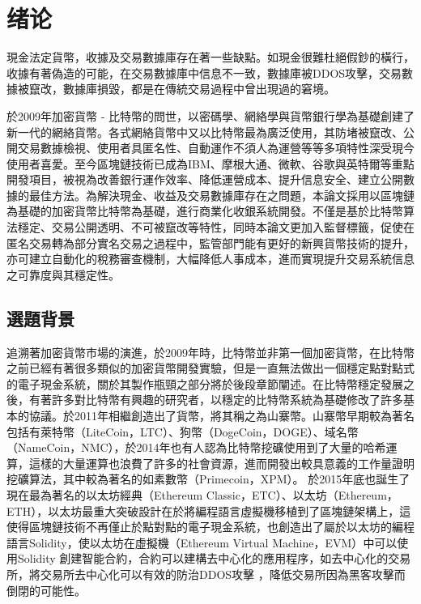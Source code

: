 
\chapter{绪论}

	現金法定貨幣，收據及交易數據庫存在著一些缺點。如現金很難杜絕假鈔的橫行，收據有著偽造的可能，在交易數據庫中信息不一致，數據庫被DDOS攻擊，交易數據被竄改，數據庫損毀，都是在傳統交易過程中曾出現過的窘境。

	於2009年加密貨幣 - 比特幣的問世，以密碼學、網絡學與貨幣銀行學為基礎創建了新一代的網絡貨幣。各式網絡貨幣中又以比特幣最為廣泛使用，其防堵被竄改、公開交易數據檢視、使⽤者具匿名性、⾃動運作不須⼈為運營等等多項特性深受現今使用者喜愛。至今區塊鏈技術已成為IBM、摩根大通、微軟、谷歌與英特爾等重點開發項目，被視為改善銀行運作效率、降低運營成本、提升信息安全、建立公開數據的最佳方法。為解決現金、收益及交易數據庫存在之問題，本論文採用以區塊鏈為基礎的加密貨幣比特幣為基礎，進行商業化收銀系統開發。不僅是基於⽐特幣算法穩定、交易公開透明、不可被竄改等特性，同時本論⽂更加⼊監督標籤，促使在匿名交易轉為部分實名交易之過程中，監管部⾨能有更好的新興貨幣技術的提升，亦可建立自動化的稅務審查機制，大幅降低人事成本，進而實現提升交易系統信息之可靠度與其穩定性。

	\section{選題背景}

		追溯著加密貨幣市場的演進，於2009年時，比特幣並非第一個加密貨幣，在比特幣之前已經有著很多類似的加密貨幣開發實驗，但是一直無法做出一個穩定點對點式的電子現金系統，關於其製作瓶頸之部分將於後段章節闡述。在比特幣穩定發展之後，有著許多對比特幣有興趣的研究者，以穩定的比特幣系統為基礎修改了許多基本的協議。於2011年相繼創造出了貨幣，將其稱之為⼭寨幣。山寨幣早期較為著名包括有萊特幣（LiteCoin，LTC）\supercite{litecoin}、狗幣（DogeCoin，DOGE）\supercite{dogecoin}、域名幣（NameCoin，NMC）\supercite{namecoin}，於2014年也有人認為比特幣挖礦使用到了大量的哈希運算，這樣的大量運算也浪費了許多的社會資源，進而開發出較具意義的工作量證明挖礦算法，其中較為著名的如素數幣（Primecoin，XPM）\supercite{primecoin}。 於2015年底也誕生了現在最為著名的以太坊經典（Ethereum Classic，ETC）\supercite{ethereumclassic}、以太坊（Ethereum，ETH）\supercite{ethereum}，以太坊最重⼤突破設計在於將編程語⾔虛擬機移植到了區塊鏈架構上，這使得區塊鏈技術不再僅止於點對點的電⼦現⾦系統，也創造出了屬於以太坊的編程語言Solidity\supercite{solidity}，使以太坊在虛擬機（Ethereum Virtual Machine，EVM）\supercite{Ethereum:Asecuredecentralisedgeneralisedtransactionledger}中可以使⽤Solidity 創建智能合約，合約可以建構去中心化的應用程序，如去中心化的交易所，將交易所去中心化可以有效的防治DDOS攻擊 \supercite{Bitcoin:Economicstechnologyandgovernance}，降低交易所因為黑客攻擊而倒閉的可能性。


